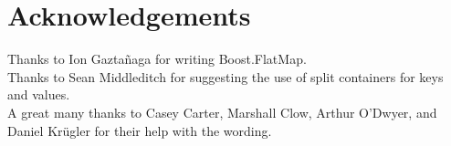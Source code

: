 \section{Acknowledgements}

Thanks to Ion Gazta{\~n}aga for writing Boost.FlatMap.\\

Thanks to Sean Middleditch for suggesting the use of split containers for keys
and values.\\

A great many thanks to Casey Carter, Marshall Clow, Arthur O'Dwyer, and Daniel Kr{\"u}gler for their help with the wording.
